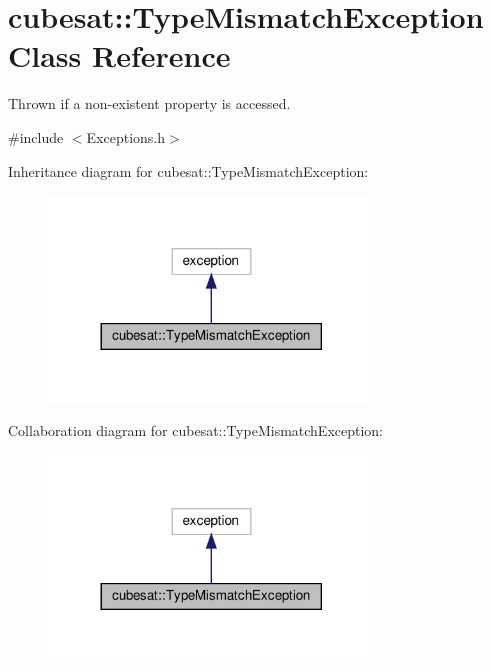 \hypertarget{classcubesat_1_1TypeMismatchException}{}\section{cubesat\+:\+:Type\+Mismatch\+Exception Class Reference}
\label{classcubesat_1_1TypeMismatchException}


Thrown if a non-\/existent property is accessed.  




{\ttfamily \#include $<$Exceptions.\+h$>$}



Inheritance diagram for cubesat\+:\+:Type\+Mismatch\+Exception\+:\nopagebreak
\begin{figure}[H]
\begin{center}
\leavevmode
\includegraphics[width=245pt]{classcubesat_1_1TypeMismatchException__inherit__graph}
\end{center}
\end{figure}


Collaboration diagram for cubesat\+:\+:Type\+Mismatch\+Exception\+:\nopagebreak
\begin{figure}[H]
\begin{center}
\leavevmode
\includegraphics[width=245pt]{classcubesat_1_1TypeMismatchException__coll__graph}
\end{center}
\end{figure}

